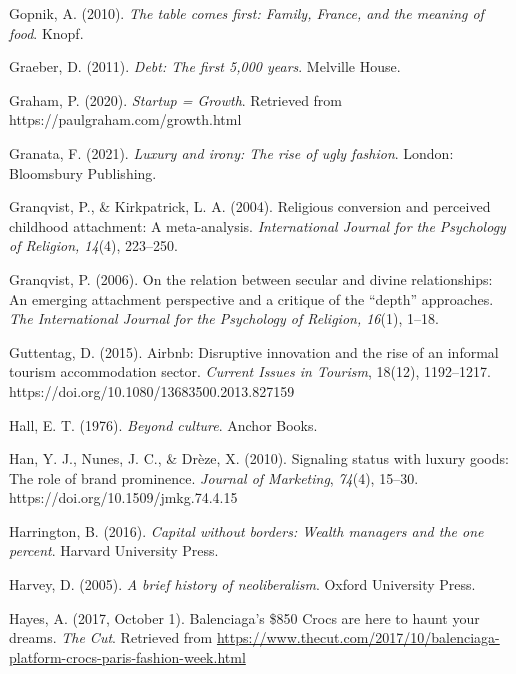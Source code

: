 \begin{thebibliography}{}
    Gopnik, A. (2010). \textit{The table comes first: Family, France, and the meaning of food}. Knopf.

    Graeber, D. (2011). \textit{Debt: The first 5{,}000 years}. Melville House.

    Graham, P. (2020). \textit{Startup = Growth}. Retrieved from https://paulgraham.com/growth.html

    Granata, F. (2021). \textit{Luxury and irony: The rise of ugly fashion}. London: Bloomsbury Publishing.

    Granqvist, P., \& Kirkpatrick, L. A. (2004). Religious conversion and perceived childhood attachment: A meta-analysis. \textit{International Journal for the Psychology of Religion, 14}(4), 223–250.

    Granqvist, P. (2006). On the relation between secular and divine relationships: An emerging attachment perspective and a critique of the “depth” approaches. \textit{The International Journal for the Psychology of Religion, 16}(1), 1–18.

    Guttentag, D. (2015). Airbnb: Disruptive innovation and the rise of an informal tourism accommodation sector. \textit{Current Issues in Tourism}, 18(12), 1192–1217. https://doi.org/10.1080/13683500.2013.827159


    Hall, E. T. (1976). \textit{Beyond culture}. Anchor Books.

    Han, Y. J., Nunes, J. C., \& Drèze, X. (2010). Signaling status with luxury goods: The role of brand prominence. \textit{Journal of Marketing}, \textit{74}(4), 15--30. https://doi.org/10.1509/jmkg.74.4.15

    Harrington, B. (2016). \textit{Capital without borders: Wealth managers and the one percent}. Harvard University Press.

    Harvey, D. (2005). \textit{A brief history of neoliberalism}. Oxford University Press.

    Hayes, A. (2017, October 1). Balenciaga’s \$850 Crocs are here to haunt your dreams. \textit{The Cut}. Retrieved from \url{https://www.thecut.com/2017/10/balenciaga-platform-crocs-paris-fashion-week.html}


\end{thebibliography}
